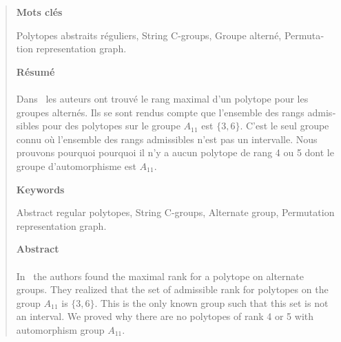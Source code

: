 \cleardoublepage{}

\thispagestyle{plain}

\hspace{3cm}

\begin{quote}

\begin{otherlanguage}{french}

\begin{center}
  \textbf{Mots clés}
\end{center}

Polytopes abstraits réguliers, String C-groups, Groupe alterné, Permutation representation graph.

\begin{center}
  \textbf{Résumé}
\end{center}


\paragraph{}
Dans~\cite{highestRankOfAn} les auteurs ont trouvé le rang maximal d'un polytope pour les groupes alternés. Ils se sont rendus compte que l'ensemble des rangs admissibles pour des polytopes sur le groupe $A_{11}$ est $\{3,6\}$. C'est le seul groupe connu où l'ensemble des rangs admissibles n'est pas un intervalle. Nous prouvons pourquoi pourquoi il n'y a aucun polytope de rang 4 ou 5 dont le groupe d'automorphisme est $A_{11}$.

\end{otherlanguage}

\begin{center}
  \textbf{Keywords}
\end{center}

Abstract regular polytopes, String C-groups, Alternate group, Permutation representation graph.

\begin{center}
  \textbf{Abstract}
\end{center}

\paragraph{}
In~\cite{highestRankOfAn} the authors found the maximal rank for a polytope on alternate groups. They realized that the set of admissible rank for polytopes on the group $A_{11}$ is $\{3,6\}$. This is the only known group such that this set is not an interval. We proved why there are no polytopes of rank 4 or 5 with automorphism group $A_{11}$.

\end{quote}
